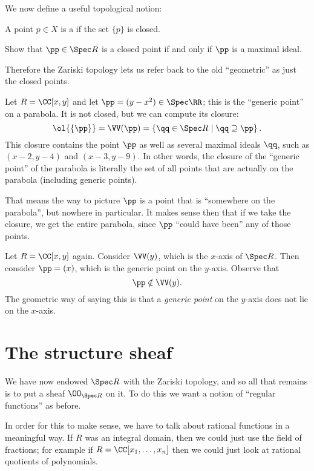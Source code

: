 We now define a useful topological notion:
\begin{definition}
	A point $p \in X$ is a  if the set $\{p\}$ is closed.
\end{definition}
\begin{ques}
	[Important]
	Show that $\pp \in \Spec R$ is a closed point
	if and only if $\pp$ is a maximal ideal.
\end{ques}
Therefore the Zariski topology lets us refer back to the old ``geometric''
as just the closed points.
\begin{example}
	Let $R = \CC[x,y]$ and let $\pp = (y-x^2) \in \Spec \RR$;
	this is the ``generic point'' on a parabola.
	It is not closed, but we can compute its closure:
	\[
		\ol{\{\pp\}}
		= \VV(\pp) = \left\{ \qq \in \Spec R \mid \qq \supseteq \pp \right\}.
	\]
	This closure contains the point $\pp$ as well
	as several maximal ideals $\qq$, such as $(x-2,y-4)$ and $(x-3,y-9)$.
	In other words, the closure of the ``generic point'' of the parabola
	is literally the set of all points that are actually on the parabola
	(including generic points).

	That means the way to picture $\pp$ is a point that 
	is ``somewhere on the parabola'', but nowhere in particular.
	It makes sense then that if we take the closure,
	we get the entire parabola,
	since $\pp$ ``could have been'' any of those points.
\end{example}

\begin{example}
	Let $R = \CC[x,y]$ again.
	Consider $\VV(y)$, which is the $x$-axis of $\Spec R$.
	Then consider $\pp = (x)$, which is the generic point on the $y$-axis.
	Observe that
	\[ \pp \notin \VV(y). \]
	The geometric way of saying this is that a \emph{generic point}
	on the $y$-axis does not lie on the $x$-axis.
\end{example}

\section{The structure sheaf}

We have now endowed $\Spec R$ with the Zariski topology,
and so all that remains is to put a sheaf $\OO_{\Spec R}$ on it.
To do this we want a notion of ``regular functions'' as before.

In order for this to make sense, we have to talk about rational
functions in a meaningful way.
If $R$ was an integral domain, then we could just use the field of fractions;
for example if $R = \CC[x_1, \dots, x_n]$ then we could just
look at rational quotients of polynomials.

